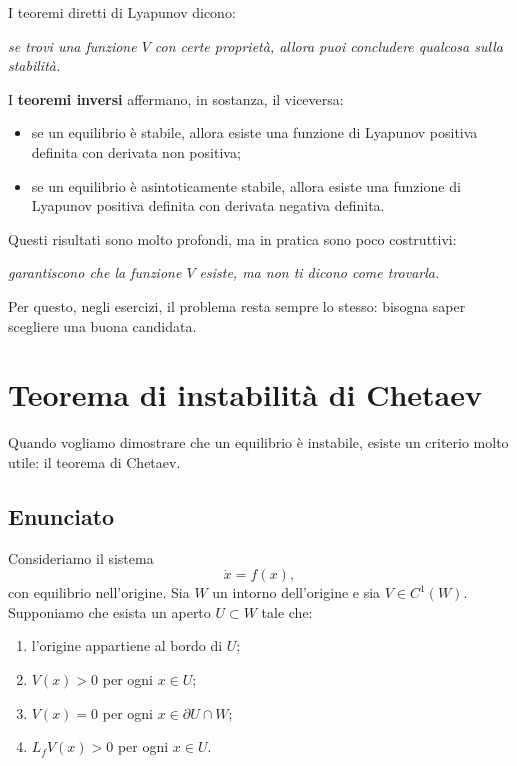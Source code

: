 I teoremi diretti di Lyapunov dicono:
\begin{center}
\emph{se trovi una funzione \(V\) con certe propriet\`a, allora puoi concludere qualcosa sulla stabilit\`a.}
\end{center}

I \textbf{teoremi inversi} affermano, in sostanza, il viceversa:

\begin{itemize}
    \item se un equilibrio \`e stabile, allora esiste una funzione di Lyapunov positiva definita con derivata non positiva;
    \item se un equilibrio \`e asintoticamente stabile, allora esiste una funzione di Lyapunov positiva definita con derivata negativa definita.
\end{itemize}

\medskip

\noindent
Questi risultati sono molto profondi, ma in pratica sono poco costruttivi:
\begin{center}
\emph{garantiscono che la funzione \(V\) esiste, ma non ti dicono come trovarla.}
\end{center}

Per questo, negli esercizi, il problema resta sempre lo stesso: bisogna saper scegliere una buona candidata.

\section{Teorema di instabilit\`a di Chetaev}
\label{sec:L24-chetaev}

Quando vogliamo dimostrare che un equilibrio \`e instabile, esiste un criterio molto utile: il teorema di Chetaev.

\subsection{Enunciato}

Consideriamo il sistema
\[
\dot x=f(x),
\]
con equilibrio nell'origine.  
Sia \(W\) un intorno dell'origine e sia \(V\in C^1(W)\). Supponiamo che esista un aperto \(U\subset W\) tale che:

\begin{enumerate}
    \item l'origine appartiene al bordo di \(U\);
    \item \(V(x)>0\) per ogni \(x\in U\);
    \item \(V(x)=0\) per ogni \(x\in \partial U \cap W\);
    \item \(L_fV(x)>0\) per ogni \(x\in U\).
\end{enumerate}

